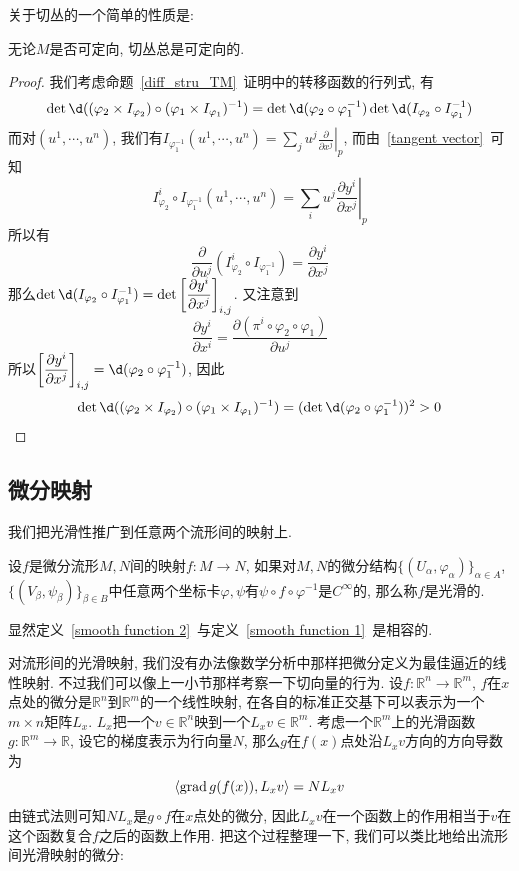 关于切丛的一个简单的性质是:
\begin{prop}
    无论$M$是否可定向, 切丛总是可定向的.
\end{prop}
\begin{proof}
    我们考虑命题~\ref{diff_stru_TM}~证明中的转移函数的行列式, 有
    \[\det\d((\varphi_2\times I_{\varphi_2})\circ(\varphi_1\times I_{\varphi_1})^{-1})=\det\d(\varphi_2\circ\varphi_1^{-1})\det\d(I_{\varphi_2}\circ I_{\varphi_1}^{-1})\]
    而对$(u^1,\cdots,u^n)$, 我们有$\displaystyle I_{\varphi_1^{-1}}(u^1,\cdots,u^n)=\left.\sum_{j}u^j\frac{\partial}{\partial x^j}\right|_p$, 而由~\eqref{tangent vector}~可知
    \[\displaystyle I_{\varphi_2}^i\circ I_{\varphi_1^{-1}}(u^1,\cdots,u^n)=\left.\sum_{i}u^j\frac{\partial y^i}{\partial x^j}\right|_p\]
    所以有
    \[\frac{\partial}{\partial u^j}(I_{\varphi_2}^i\circ I_{\varphi_1^{-1}})=\frac{\partial y^i}{\partial x^j}\]
    那么$\det\d(I_{\varphi_2}\circ I_{\varphi_1}^{-1})=\det\left[\dfrac{\partial y^i}{\partial x^j}\right]_{i,j}$.
    又注意到
    \[\frac{\partial y^i}{\partial x^i}=\frac{\partial(\pi^i\circ\varphi_2\circ\varphi_1)}{\partial u^j}\]
    所以$\left[\dfrac{\partial y^i}{\partial x^j}\right]_{i,j}=\d(\varphi_2\circ\varphi_1^{-1})$, 因此
    \[\det\d((\varphi_2\times I_{\varphi_2})\circ(\varphi_1\times I_{\varphi_1})^{-1})=(\det\d(\varphi_2\circ\varphi_1^{-1}))^2>0\qedhere\]
\end{proof}

\subsection*{微分映射}

我们把光滑性推广到任意两个流形间的映射上.

\begin{defn}\label{smooth function 2}
    设$f$是微分流形$M,N$间的映射$f:M\to N$, 如果对$M,N$的微分结构$\{(U_\alpha,\varphi_\alpha)\}_{\alpha\in A}$, $\{(V_\beta,\psi_\beta)\}_{\beta\in B}$中任意两个坐标卡$\varphi,\psi$有$\psi\circ f\circ\varphi^{-1}$是$C^\infty$的, 那么称$f$是光滑的.
\end{defn}

显然定义~\ref{smooth function 2}~与定义~\ref{smooth function 1}~是相容的.

对流形间的光滑映射, 我们没有办法像数学分析中那样把微分定义为最佳逼近的线性映射.
不过我们可以像上一小节那样考察一下切向量的行为.
设$f:\mathbb{R}^n\to\mathbb{R}^m$, $f$在$x$点处的微分是$\mathbb{R}^n$到$\mathbb{R}^m$的一个线性映射, 在各自的标准正交基下可以表示为一个$m\times n$矩阵$L_x$.
$L_x$把一个$v\in\mathbb{R}^n$映到一个$L_xv\in\mathbb{R}^m$.
考虑一个$\mathbb{R}^m$上的光滑函数$g:\mathbb{R}^m\to\mathbb{R}$, 设它的梯度表示为行向量$N$, 那么$g$在$f(x)$点处沿$L_xv$方向的方向导数为
\[\langle\operatorname{grad}{g(f(x))},L_xv\rangle=NL_xv\]
由链式法则可知$NL_x$是$g\circ f$在$x$点处的微分, 因此$L_xv$在一个函数上的作用相当于$v$在这个函数复合$f$之后的函数上作用.
把这个过程整理一下, 我们可以类比地给出流形间光滑映射的微分:

